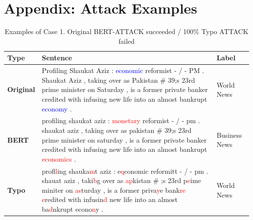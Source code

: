 \documentclass[11pt,a4paper]{article}
\newcommand{\red}[1]{\textcolor{red}{#1}}
\newcommand{\blue}[1]{\textcolor{blue}{#1}}
\begin{document}



\newpage

\appendix

\section{Appendix: Attack Examples}

\label{sec:appendix}

{\renewcommand{\arraystretch}{1.5}
\begin{table}[]
{\small
\begin{tabularx}{\textwidth}{l|X|l}
\hline
\textbf{Type} & \textbf{Sentence}  & \textbf{Label}  \\ \hline
\textbf{Original}  & Profiling Shaukat Aziz : \blue{economic} reformist - / - PM . Shaukat Aziz , taking over as Pakistan \newline \# 39;s 23rd prime minister on Saturday , is a former private banker credited with infusing new \newline life into an almost bankrupt \blue{economy} .   & World News    \\ \hline
\textbf{BERT} & profiling shaukat aziz : \red{monetary} reformist - / - pm . shaukat aziz , taking over as pakistan \# 39;s \newline 23rd prime minister on saturday , is a former private banker credited with infusing new life \newline into an almost bankrupt \red{economics} . & Business News \\ \hline
\textbf{Typo} & prof\red{ll}ing shauka\red{m}t aziz : e\red{q}conomic reformitt - / - pm . shauat aziz , taki\red{b}g over as \red{ap}kistan \# \newline 39;s 23rd p\red{e}ime miniter on \red{as}turday , is a former priva\red{y}e bank\red{re} \red{e}redited with infusin\red{d} new life
\newline into an almost ba\red{d}nkrupt econo\red{n}y .  & World News    \\ \hline
\end{tabularx}
}
\caption{Examples of Case 1. Original BERT-ATTACK succeeded / 100\% Typo ATTACK failed }
\end{table}
}
\end{document}
